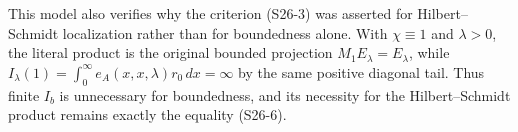 \documentclass[
  11pt,
]{article}
\begin{document}
This model also verifies why the criterion (S26-3) was asserted for
Hilbert--Schmidt localization rather than for boundedness alone. With
\(\chi\equiv1\) and \(\lambda>0\), the literal product is the original
bounded projection \(M_1E_\lambda=E_\lambda\), while
\(I_\lambda(1)=\int_0^\infty e_A(x,x,\lambda)r_0\,dx=\infty\) by the
same positive diagonal tail. Thus finite \(I_b\) is unnecessary for
boundedness, and its necessity for the Hilbert--Schmidt product remains
exactly the equality (S26-6).
\end{document}
